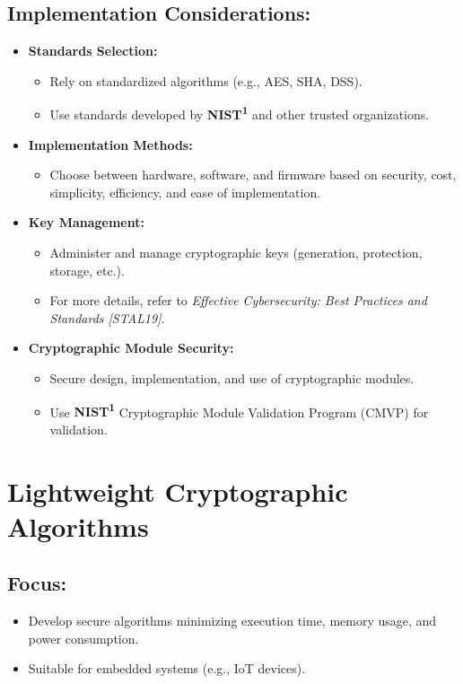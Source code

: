 \subsection{Implementation Considerations:}
\begin{itemize}
    \item \textbf{Standards Selection:}
    \begin{itemize}
        \item Rely on standardized algorithms (e.g., AES, SHA, DSS).
        \item Use standards developed by \textbf{NIST\textsuperscript{1}} and other trusted organizations.
    \end{itemize}
    \item \textbf{Implementation Methods:}
    \begin{itemize}
        \item Choose between hardware, software, and firmware based on security, cost, simplicity, efficiency, and ease of implementation.
    \end{itemize}
    \item \textbf{Key Management:}
    \begin{itemize}
        \item Administer and manage cryptographic keys (generation, protection, storage, etc.).
        \item For more details, refer to \textit{Effective Cybersecurity: Best Practices and Standards [STAL19]}.
    \end{itemize}
    \item \textbf{Cryptographic Module Security:}
    \begin{itemize}
        \item Secure design, implementation, and use of cryptographic modules.
        \item Use \textbf{NIST\textsuperscript{1}} Cryptographic Module Validation Program (CMVP) for validation.
    \end{itemize}
\end{itemize}

\section{Lightweight Cryptographic Algorithms}

\subsection{Focus:}
\begin{itemize}
    \item Develop secure algorithms minimizing execution time, memory usage, and power consumption.
    \item Suitable for embedded systems (e.g., IoT devices).
\end{itemize}

